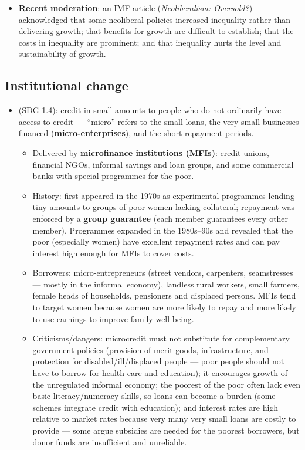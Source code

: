 \begin{itemize}
\begin{itemize}
    \item \textbf{Recent moderation}: an IMF article (\textit{Neoliberalism: Oversold?}) acknowledged that some neoliberal policies increased inequality rather than delivering growth; that benefits for growth are difficult to establish; that the costs in inequality are prominent; and that inequality hurts the level and sustainability of growth.
  \end{itemize}
\end{itemize}

\subsection{Institutional change}
\begin{itemize}
  \item {} (SDG 1.4): credit in small amounts to people who do not ordinarily have access to credit --- ``micro'' refers to the small loans, the very small businesses financed (\textbf{micro-enterprises}), and the short repayment periods.
  \begin{itemize}
    \item Delivered by \textbf{microfinance institutions (MFIs)}: credit unions, financial NGOs, informal savings and loan groups, and some commercial banks with special programmes for the poor.
    \item History: first appeared in the 1970s as experimental programmes lending tiny amounts to groups of poor women lacking collateral; repayment was enforced by a \textbf{group guarantee} (each member guarantees every other member). Programmes expanded in the 1980s--90s and revealed that the poor (especially women) have excellent repayment rates and can pay interest high enough for MFIs to cover costs.
    \item Borrowers: micro-entrepreneurs (street vendors, carpenters, seamstresses --- mostly in the informal economy), landless rural workers, small farmers, female heads of households, pensioners and displaced persons. MFIs tend to target women because women are more likely to repay and more likely to use earnings to improve family well-being.
    \item Criticisms/dangers: microcredit must not substitute for complementary government policies (provision of merit goods, infrastructure, and protection for disabled/ill/displaced people --- poor people should not have to borrow for health care and education); it encourages growth of the unregulated informal economy; the poorest of the poor often lack even basic literacy/numeracy skills, so loans can become a burden (some schemes integrate credit with education); and interest rates are high relative to market rates because very many very small loans are costly to provide --- some argue subsidies are needed for the poorest borrowers, but donor funds are insufficient and unreliable.

\end{itemize}
\end{itemize}
